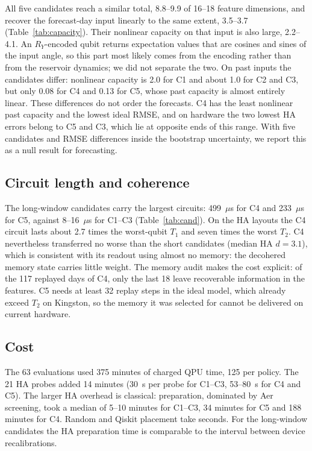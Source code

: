 \documentclass[journal]{IEEEtran}
\begin{document}
All five candidates reach a similar total, 8.8--9.9 of 16--18 feature dimensions, and recover the forecast-day input linearly to the same extent, 3.5--3.7 (Table~\ref{tab:capacity}). Their nonlinear capacity on that input is also large, 2.2--4.1. An $R_Y$-encoded qubit returns expectation values that are cosines and sines of the input angle, so this part most likely comes from the encoding rather than from the reservoir dynamics; we did not separate the two. On past inputs the candidates differ: nonlinear capacity is 2.0 for C1 and about 1.0 for C2 and C3, but only 0.08 for C4 and 0.13 for C5, whose past capacity is almost entirely linear. These differences do not order the forecasts. C4 has the least nonlinear past capacity and the lowest ideal RMSE, and on hardware the two lowest HA errors belong to C5 and C3, which lie at opposite ends of this range. With five candidates and RMSE differences inside the bootstrap uncertainty, we report this as a null result for forecasting.

\subsection{Circuit length and coherence}
The long-window candidates carry the largest circuits: 499~$\mu$s for C4 and 233~$\mu$s for C5, against 8--16~$\mu$s for C1--C3 (Table~\ref{tab:cand}). On the HA layouts the C4 circuit lasts about 2.7 times the worst-qubit $T_1$ and seven times the worst $T_2$. C4 nevertheless transferred no worse than the short candidates (median HA $d=3.1$), which is consistent with its readout using almost no memory: the decohered memory state carries little weight. The memory audit makes the cost explicit: of the 117 replayed days of C4, only the last 18 leave recoverable information in the features. C5 needs at least 32 replay steps in the ideal model, which already exceed $T_2$ on Kingston, so the memory it was selected for cannot be delivered on current hardware.

\subsection{Cost}
The 63 evaluations used 375 minutes of charged QPU time, 125 per policy. The 21 HA probes added 14 minutes (30~s per probe for C1--C3, 53--80~s for C4 and C5). The larger HA overhead is classical: preparation, dominated by Aer screening, took a median of 5--10 minutes for C1--C3, 34 minutes for C5 and 188 minutes for C4. Random and Qiskit placement take seconds. For the long-window candidates the HA preparation time is comparable to the interval between device recalibrations.
\end{document}
